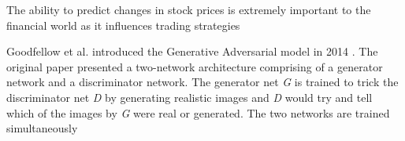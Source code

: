 The ability to predict changes in stock prices is extremely important to the financial world as it influences trading strategies


Goodfellow et al. introduced the Generative Adversarial model in 2014 \cite{gan_original}. The original paper presented a two-network architecture comprising of a generator network and a discriminator network. The generator net \textit{G} is trained to trick the discriminator net \textit{D} by generating realistic images and \textit{D} would try and tell which of the images by \textit{G} were real or generated. The two networks are trained simultaneously